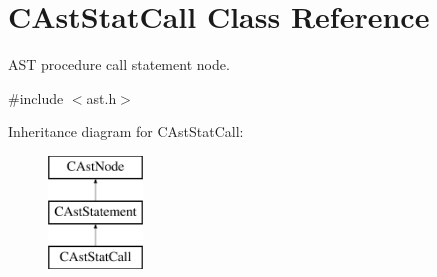 \hypertarget{classCAstStatCall}{\section{C\-Ast\-Stat\-Call Class Reference}
\label{classCAstStatCall}
}


A\-S\-T procedure call statement node.  




{\ttfamily \#include $<$ast.\-h$>$}

Inheritance diagram for C\-Ast\-Stat\-Call\-:\begin{figure}[H]
\begin{center}
\leavevmode
\includegraphics[height=3.000000cm]{classCAstStatCall}
\end{center}
\end{figure}
